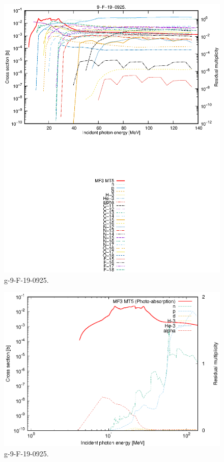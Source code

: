 \begin{figure}
 \includegraphics[width=\linewidth]{eps/g_9-F-19_0925.eps}
  \caption{g-9-F-19-0925.}
\end{figure}
\newpage \clearpage

\begin{figure}
 \includegraphics[width=\linewidth]{eps-log/g_9-F-19_0925.eps}
 \caption{g-9-F-19-0925.}
\end{figure}
\newpage \clearpage

